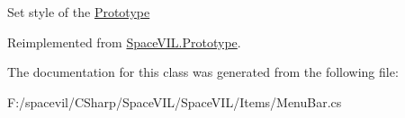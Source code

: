 Set style of the \mbox{\hyperlink{class_space_v_i_l_1_1_prototype}{Prototype}} 



Reimplemented from \mbox{\hyperlink{class_space_v_i_l_1_1_prototype_ae96644a6ace490afb376fb542161e541}{Space\+V\+I\+L.\+Prototype}}.



The documentation for this class was generated from the following file\+:\begin{DoxyCompactItemize}
\item 
F\+:/spacevil/\+C\+Sharp/\+Space\+V\+I\+L/\+Space\+V\+I\+L/\+Items/Menu\+Bar.\+cs\end{DoxyCompactItemize}
